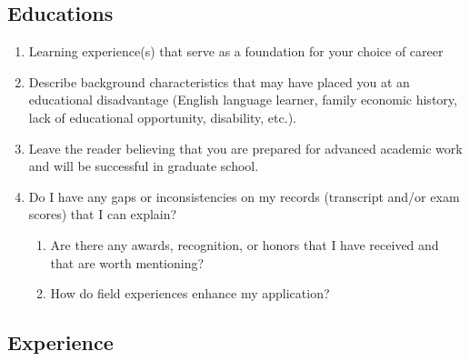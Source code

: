 \documentclass[a4paper,12pt]{article}%
\begin{document}
	  \hrulefill
	  
	  \hrulefill
	  
	  \hrulefill
	  
	  \hrulefill
	  
\subsection{Educations}
\label{sec:Educations}
\begin{enumerate}
 	\item	Learning experience(s) that serve as a foundation for your choice of career
\item 	Describe background characteristics that may have placed you at an educational disadvantage (English language learner, family economic history, lack of educational opportunity, disability, etc.).
	\item Leave the reader believing that you are prepared for advanced academic work and will be successful in graduate school.\\
\hrulefill

\hrulefill

	\item Do I have any gaps or inconsistencies on my records (transcript and/or exam scores) that I can explain?
 
 
 \begin{enumerate}
 
	\item Are there any awards, recognition, or honors that I have received and that are worth mentioning?
	\item How do field experiences enhance my application?
\end{enumerate}
 
	
 	\end{enumerate}
 		  \hrulefill
 		  
	  \hrulefill
	  
	  \hrulefill
	  
 	
\subsection{Experience}
\label{sec:Experience}
\end{document}
